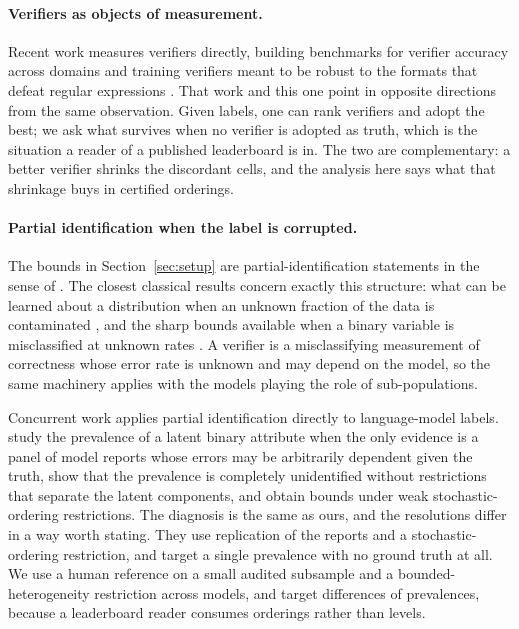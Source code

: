 \paragraph{Verifiers as objects of measurement.}
Recent work measures verifiers directly, building benchmarks for verifier accuracy across
domains \citep{li2025verifybench} and training verifiers meant to be robust to the formats
that defeat regular expressions \citep{liu2025compassverifier}. That work and this one point
in opposite directions from the same observation. Given labels, one can rank verifiers and
adopt the best; we ask what survives when no verifier is adopted as truth, which is the
situation a reader of a published leaderboard is in. The two are complementary: a better
verifier shrinks the discordant cells, and the analysis here says what that shrinkage buys in
certified orderings.

\paragraph{Partial identification when the label is corrupted.}
The bounds in Section~\ref{sec:setup} are partial-identification statements in the sense of
\citet{manski2003partial}. The closest classical results concern exactly this structure: what
can be learned about a distribution when an unknown fraction of the data is contaminated
\citep{horowitz1995identification}, and the sharp bounds available when a binary variable is
misclassified at unknown rates \citep{molinari2008partial}. A verifier is a misclassifying
measurement of correctness whose error rate is unknown and may depend on the model, so the
same machinery applies with the models playing the role of sub-populations.

Concurrent work applies partial identification directly to language-model labels.
\citet{chen2026partial} study the prevalence of a latent binary attribute when the only
evidence is a panel of model reports whose errors may be arbitrarily dependent given the
truth, show that the prevalence is completely unidentified without restrictions that separate
the latent components, and obtain bounds under weak stochastic-ordering restrictions. The
diagnosis is the same as ours, and the resolutions differ in a way worth stating. They use
replication of the reports and a stochastic-ordering restriction, and target a single
prevalence with no ground truth at all. We use a human reference on a small audited subsample
and a bounded-heterogeneity restriction across models, and target differences of prevalences,
because a leaderboard reader consumes orderings rather than levels.

